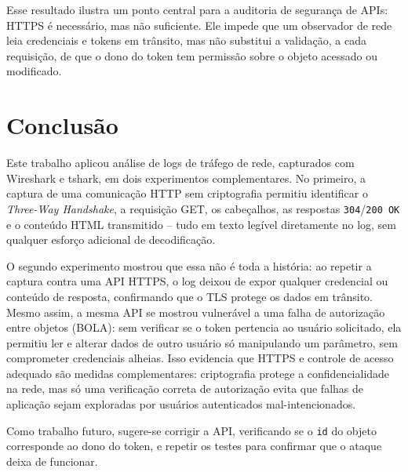 \documentclass[12pt]{article}
\begin{document}
Esse resultado ilustra um ponto central para a auditoria de segurança de
APIs: HTTPS é necessário, mas não suficiente. Ele impede que um observador
de rede leia credenciais e tokens em trânsito, mas não substitui a
validação, a cada requisição, de que o dono do token tem permissão sobre o
objeto acessado ou modificado.

\FloatBarrier
\section{Conclusão}\label{sec:conclusao}

Este trabalho aplicou análise de logs de tráfego de rede, capturados com
Wireshark e tshark, em dois experimentos complementares. No primeiro, a
captura de uma comunicação HTTP sem criptografia permitiu identificar o
\textit{Three-Way Handshake}, a requisição GET, os cabeçalhos, as respostas
\texttt{304}/\texttt{200 OK} e o conteúdo HTML transmitido -- tudo em texto
legível diretamente no log, sem qualquer esforço adicional de
decodificação.

O segundo experimento mostrou que essa não é toda a história: ao repetir a
captura contra uma API HTTPS, o log deixou de expor qualquer credencial ou
conteúdo de resposta, confirmando que o TLS protege os dados em trânsito.
Mesmo assim, a mesma API se mostrou vulnerável a uma falha de autorização
entre objetos (BOLA): sem verificar se o token pertencia ao usuário
solicitado, ela permitiu ler e alterar dados de outro usuário só
manipulando um parâmetro, sem comprometer credenciais alheias. Isso
evidencia que HTTPS e controle de acesso adequado são medidas
complementares: criptografia protege a confidencialidade na rede, mas só
uma verificação correta de autorização evita que falhas de aplicação sejam
exploradas por usuários autenticados mal-intencionados.

Como trabalho futuro, sugere-se corrigir a API, verificando se o
\texttt{id} do objeto corresponde ao dono do token, e repetir os testes
para confirmar que o ataque deixa de funcionar.

{\footnotesize


}
\end{document}

